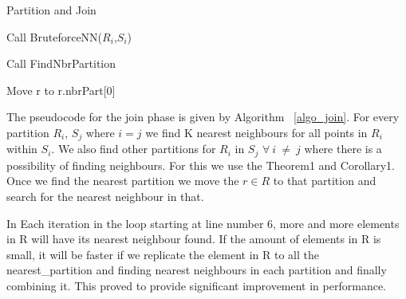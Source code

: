 \begin{algorithm}
  \caption{Partition and Join}
  \label{algo_join}
  \begin{algorithmic}[1]
    \REPEAT

    \STATE Call BruteforceNN($R_i$,$S_i$)
    \ENDFOR

    \STATE Call FindNbrPartition

    \STATE Move r to r.nbrPart[0]
    \ENDFOR


  \end{algorithmic}
\end{algorithm}


\bigskip

The pseudocode for the join phase is given by Algorithm ~\ref{algo_join}.
For every partition $R_i$,
$S_j$ where $i=j$ we find K nearest neighbours for all points in
$R_i$ within $S_i$. We also find other partitions for $R_i$ in $S_j$
$\forall\ i\ \neq\ j$ where there is a possibility of finding
neighbours. For this we use the Theorem1 and Corollary1.
Once we find the nearest partition we move the $r \in R$ to that partition
and search for the nearest neighbour in that.

In Each iteration in the loop starting at line number 6, more and more elements in R will have its nearest
neighbour found. If the amount of elements in R is small, it will be
faster if we replicate the element in R to all the nearest\_partition
and finding nearest neighbours in each partition and finally combining
it. This proved to provide significant improvement in performance.

\bigskip

